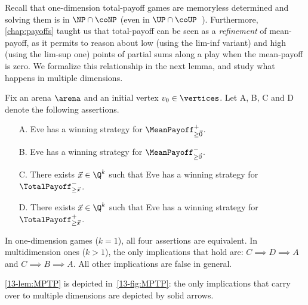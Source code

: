 Recall that one-dimension total-payoff games are memoryless determined and solving them is in $\NP \cap \coNP$ (even in $\UP \cap \coUP$~\cite{Gawlitza&Seidl:2009}). Furthermore, \cref{chap:payoffs} taught us that total-payoff can be seen as a \textit{refinement} of mean-payoff, as it permits to reason about low (using the lim-inf variant) and high (using the lim-sup one) points of partial sums along a play when the mean-payoff is zero. We formalize this relationship in the next lemma, and study what happens in multiple dimensions. 

\begin{lemma}
\label{13-lem:MPTP}
Fix an arena $\arena$ and an initial vertex $v_0 \in \vertices$. Let A, B, C and D denote the following assertions.
\begin{enumerate}
\item[A.] Eve has a winning strategy for $\MeanPayoff^{+}_{\geq \vec{0}}$.
\item[B.] Eve has a winning strategy for $\MeanPayoff^{-}_{\geq \vec{0}}$.
\item[C.] There exists $\vec{x} \in \Q^{k}$ such that Eve has a winning strategy for $\TotalPayoff^{-}_{\geq \vec{x}}$.
\item[D.] There exists $\vec{x} \in \Q^{k}$ such that Eve has a winning strategy for $\TotalPayoff^{+}_{\geq \vec{x}}$.
\end{enumerate}
In one-dimension games ($k = 1$), all four assertions are equivalent. In multidimension ones ($k > 1$), the only implications that hold are: $C \implies D \implies A$ and $C \implies B \implies A$. All other implications are false in general.
\end{lemma}

\cref{13-lem:MPTP} is depicted in~\cref{13-fig:MPTP}: the only implications that carry over to multiple dimensions are depicted by solid arrows.

